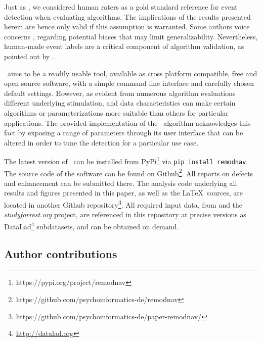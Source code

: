 Just as \cite{Andersson2017}, we considered human raters as a gold standard
reference for event detection when evaluating algorithms.  The implications of
the results presented herein are hence only valid if this assumption is
warranted. Some authors voice concerns \cite[\eg][]{5523936}, regarding
potential biases that may limit generalizability. Nevertheless, human-made
event labels are a critical component of algorithm validation, as pointed out
by \cite{Hooge2018}.

\remodnav\ aims to be a readily usable tool, available as cross platform
compatible, free and open source software, with a simple command line interface
and carefully chosen default settings. However, as evident from numerous
algorithm evaluations
\citep[\eg][]{Andersson2017,Larsson2013,Zemblys2018,5523936} different
underlying stimulation, and data characteristics can make certain algorithms or
parameterizations more suitable than others for particular applications. The
provided implementation of the \remodnav\ algorithm \citep{michael_hanke_2019_2651042}
acknowledges this fact by
exposing a range of parameters through its user interface that can be altered
in order to tune the detection for a particular use case.

The latest version of \remodnav\ can be installed from
PyPi\footnote{https://pypi.org/project/remodnav} via \texttt{pip install
remodnav}. The source code of the software can be found on
Github\footnote{https://github.com/psychoinformatics-de/remodnav}. All reports
on defects and enhancement can be submitted there.
%
The analysis code underlying all results and figures presented in this paper,
as well as the \LaTeX\ sources, are located in another Github
repository\footnote{https://github.com/psychoinformatics-de/paper-remodnav/}.
All required input data, from \cite{Andersson2017} and the
\textit{studyforrest.org} project, are referenced in this repository at precise
versions as DataLad\footnote{\url{http://datalad.org}} subdatasets, and can be
obtained on demand.

\subsection*{Author contributions}


